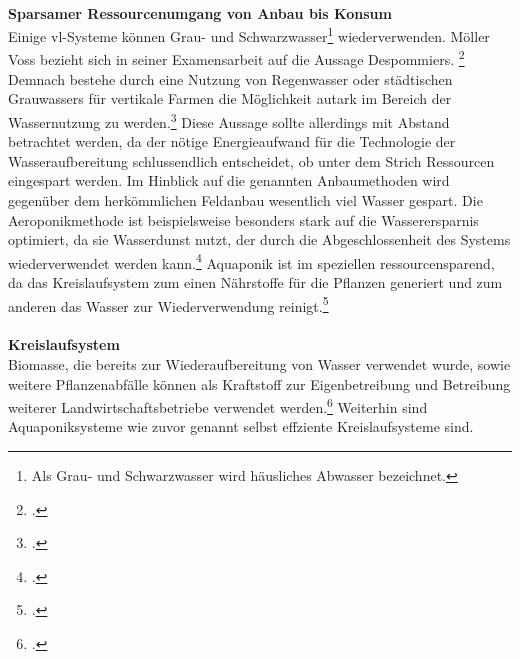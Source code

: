 \documentclass{scrartcl}
\begin{document}
\\
\textbf{Sparsamer Ressourcenumgang von Anbau bis Konsum}\\
Einige \acs{vl}-Systeme können Grau- und Schwarzwasser\footnote{Als Grau- und Schwarzwasser wird häusliches Abwasser bezeichnet.} wiederverwenden.
Möller Voss bezieht sich in seiner Examensarbeit auf die Aussage Despommiers. \footcite[S.9]{PeterMollerVoss2013VerticalRise} Demnach bestehe durch eine Nutzung von Regenwasser oder städtischen Grauwassers für vertikale Farmen die Möglichkeit autark im Bereich der Wassernutzung zu werden.\footcite[Vgl.]{Despommier2010TheCentury.} Diese Aussage sollte allerdings mit Abstand betrachtet werden, da der nötige Energieaufwand für die Technologie der Wasseraufbereitung schlussendlich entscheidet, ob unter dem Strich Ressourcen eingespart werden. Im Hinblick auf die genannten Anbaumethoden wird gegenüber dem herkömmlichen Feldanbau wesentlich viel Wasser gespart. Die Aeroponikmethode ist beispielsweise besonders stark auf die Wasserersparnis optimiert, da sie Wasserdunst nutzt, der durch die Abgeschlossenheit des Systems wiederverwendet werden kann.\footcite[Vgl.][S.8f]{Al-Kodmany2018TheCity} Aquaponik ist im speziellen ressourcensparend, da das Kreislaufsystem zum einen Nährstoffe für die Pflanzen generiert und zum anderen das Wasser zur Wiederverwendung reinigt.\footcite[Vgl.][S.10f]{Al-Kodmany2018TheCity}\\
\\
\textbf{Kreislaufsystem}\\
Biomasse, die bereits zur Wiederaufbereitung von Wasser verwendet wurde, sowie weitere Pflanzenabfälle können als Kraftstoff zur Eigenbetreibung und Betreibung weiterer Landwirtschaftsbetriebe verwendet werden.\footcite[Vgl.][S.80ff]{Despommier2009TheFarms} Weiterhin sind Aquaponiksysteme wie zuvor genannt selbst effziente Kreislaufsysteme sind. 






\end{document}
